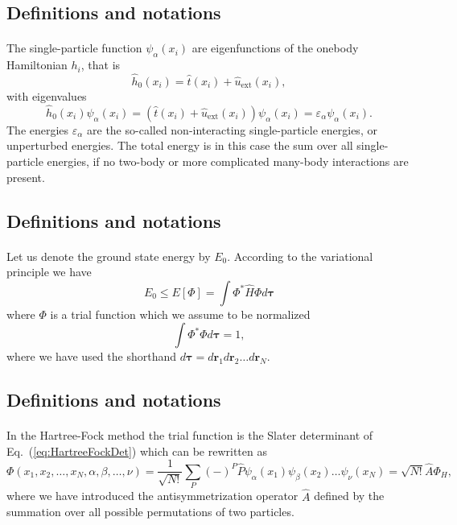 \documentclass[%
twoside,                 %
final,                   %
10pt]{article}
\begin{document}
\subsection{Definitions and notations}

\paragraph{}
The single-particle function $\psi_{\alpha}(x_i)$  are eigenfunctions of the onebody
Hamiltonian $h_i$, that is
\[
\hat{h}_0(x_i)=\hat{t}(x_i) + \hat{u}_{\mathrm{ext}}(x_i),
\]
with eigenvalues 
\[
\hat{h}_0(x_i) \psi_{\alpha}(x_i)=\left(\hat{t}(x_i) + \hat{u}_{\mathrm{ext}}(x_i)\right)\psi_{\alpha}(x_i)=\varepsilon_{\alpha}\psi_{\alpha}(x_i).
\]
The energies $\varepsilon_{\alpha}$ are the so-called non-interacting single-particle energies, or unperturbed energies. 
The total energy is in this case the sum over all  single-particle energies, if no two-body or more complicated
many-body interactions are present.



\subsection{Definitions and notations}

\paragraph{}
Let us denote the ground state energy by $E_0$. According to the
variational principle we have
\[
  E_0 \le E[\Phi] = \int \Phi^*\hat{H}\Phi d\mathbf{\tau}
\]
where $\Phi$ is a trial function which we assume to be normalized
\[
  \int \Phi^*\Phi d\mathbf{\tau} = 1,
\]
where we have used the shorthand $d\mathbf{\tau}=d\mathbf{r}_1d\mathbf{r}_2\dots d\mathbf{r}_N$.



\subsection{Definitions and notations}

\paragraph{}
In the Hartree-Fock method the trial function is the Slater
determinant of Eq.~(\ref{eq:HartreeFockDet}) which can be rewritten as 
\[
  \Phi(x_1,x_2,\dots,x_N,\alpha,\beta,\dots,\nu) = \frac{1}{\sqrt{N!}}\sum_{P} (-)^P\hat{P}\psi_{\alpha}(x_1)
    \psi_{\beta}(x_2)\dots\psi_{\nu}(x_N)=\sqrt{N!}\hat{A}\Phi_H,
\]
where we have introduced the antisymmetrization operator $\hat{A}$ defined by the 
summation over all possible permutations of two particles.
\end{document}

